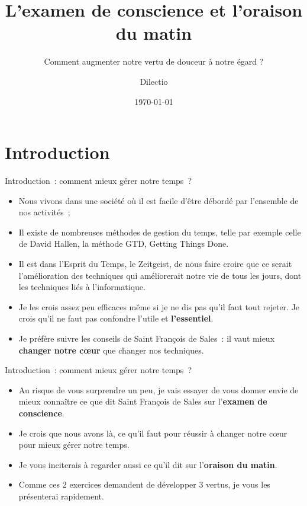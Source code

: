 \documentclass[11pt,xcolor=dvipsname,ignorenonframetext,handout]{beamer}
\title{L'examen de conscience et l'oraison du matin}
\subtitle{Comment augmenter notre vertu de douceur à notre égard ?}
\author{Dilectio}
\institute{}
\date{\today}
\begin{document}
\begin{frame}
  \titlepage
\end{frame}

\section{Introduction}
\begin{frame}{Introduction~: comment mieux gérer notre temps~?}
    \begin{itemize}
        \rightskip=0pt\leftskip=0pt
        \item Nous vivons dans une société où il est facile d'être débordé par l'ensemble de nos activités~;
        \item Il existe de nombreuses méthodes de gestion du temps, telle par exemple celle de David Hallen, la méthode GTD, Getting Things Done.
        \item Il est dans l'Esprit du Temps, le Zeitgeist, de nous faire croire que ce serait l'amélioration des techniques qui améliorerait notre vie de tous les jours, dont les techniques liés à l'informatique.
        \item Je les crois assez peu efficaces même si je ne dis pas qu'il faut tout rejeter. Je crois qu'il ne faut pas confondre l'utile et \textbf{l'essentiel}.
        \item Je préfère suivre les conseils de Saint François de Sales~: il vaut mieux \textbf{changer notre cœur} que changer nos techniques.
    \end{itemize}  
\begin{frame}{Introduction~: comment mieux gérer notre temps~?}
    \begin{itemize}
        \rightskip=0pt\leftskip=0pt
        \item Au risque de vous surprendre un peu, je vais essayer de vous donner envie de mieux connaître ce que dit Saint François de Sales sur l'\textbf{examen de conscience}.
        \item Je crois que nous avons là, ce qu'il faut pour réussir à changer notre cœur pour mieux gérer notre temps.
        \item Je vous inciterais à regarder aussi ce qu'il dit sur l'\textbf{oraison du matin}.
        \item Comme ces 2 exercices demandent de développer 3 vertus, je vous les présenterai rapidement.

\end{itemize}
\end{frame}
\end{frame}
\end{document}
